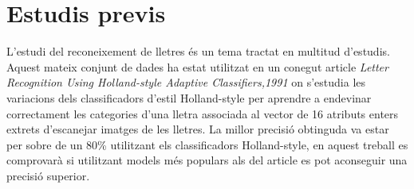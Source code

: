 \section{Estudis previs}
L'estudi del reconeixement de lletres és un tema tractat en multitud d'estudis. Aquest mateix conjunt de dades ha estat utilitzat en un conegut article \textit{Letter Recognition Using Holland-style Adaptive Classifiers,1991}\cite{frey1991letter} on s'estudia les variacions dels classificadors d'estil Holland-style per aprendre a endevinar correctament les categories d'una lletra associada al vector de 16 atributs enters extrets d'escanejar imatges de les lletres. La millor precisió obtinguda va estar per sobre de un 80\% utilitzant els classificadors Holland-style, en aquest treball es comprovarà si utilitzant models més populars als del article es pot aconseguir una precisió superior.

